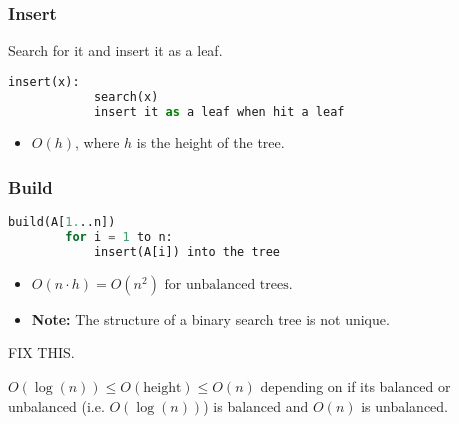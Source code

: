 \subsubsection{Insert}

\begin{definition}
    Search for it and insert it as a leaf. 

    \begin{lstlisting}[language=Python, caption={Insert Operation}]
        insert(x):
            search(x)
            insert it as a leaf when hit a leaf
    \end{lstlisting}

    \begin{itemize}
        \item \( O(h) \), where \( h \) is the height of the tree.
    \end{itemize}
\end{definition}

\subsubsection{Build}
\begin{definition}
    \begin{lstlisting}[language=Python, caption={Build Operation}]
    build(A[1...n])
        for i = 1 to n:
            insert(A[i]) into the tree
    \end{lstlisting}

    \begin{itemize}
        \item $O(n \cdot h) = O(n^2) \text{ for unbalanced trees}.$
        \item \textbf{Note:} The structure of a binary search tree is not unique.
    \end{itemize}
\end{definition}

\begin{example}
    FIX THIS. 
\end{example}

\begin{warning}
    $O(\log(n)) \leq O(\text{height}) \leq O(n)$ depending on if its balanced or unbalanced (i.e. $O(\log (n))$) is balanced and $O(n)$ is unbalanced.
\end{warning}

